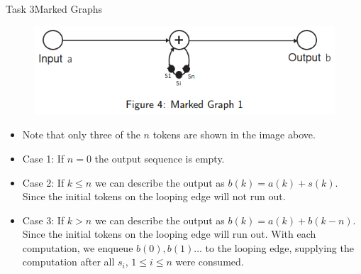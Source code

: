 \begin{frame}{Task 3}{Marked Graphs}
    \begin{solutionnoinc}
        \begin{figure}
            \centering
            \includegraphics[scale=0.35]{figures/markedGraph2.png}
        \end{figure}
        \begin{itemize}
            \item Note that only three of the $n$ tokens are shown in the image above.
            \item Case 1: If $n = 0$ the output sequence is empty.
            \item Case 2: If $k \leq n$ we can describe the output as $b(k) = a(k) + s(k)$. Since the initial tokens on the looping edge will not run out.
            \item Case 3: If $k > n$ we can describe the output as $b(k) = a(k) + b(k-n)$. Since the initial tokens on the looping edge will run out. With each computation, we enqueue $b(0), b(1)...$ to the looping edge, supplying the computation after all $s_i$, $1 \leq i \leq n$ were consumed.
        \end{itemize}
    \end{solutionnoinc}
\end{frame}